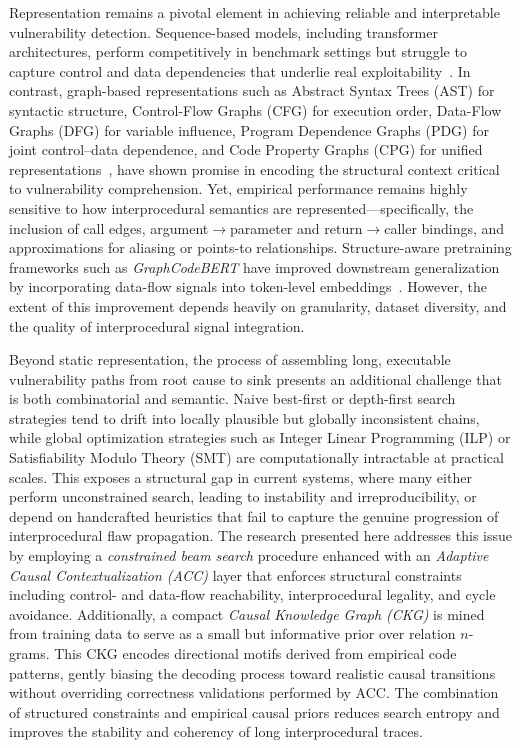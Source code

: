 \documentclass{buthesis}
\begin{document}
Representation remains a pivotal element in achieving reliable and interpretable vulnerability detection. Sequence-based models, including transformer architectures, perform competitively in benchmark settings but struggle to capture control and data dependencies that underlie real exploitability~\cite{fu2022linevul,Chakraborty2020}. In contrast, graph-based representations such as Abstract Syntax Trees (AST) for syntactic structure, Control-Flow Graphs (CFG) for execution order, Data-Flow Graphs (DFG) for variable influence, Program Dependence Graphs (PDG) for joint control–data dependence, and Code Property Graphs (CPG) for unified representations~\cite{Zhou2019}, have shown promise in encoding the structural context critical to vulnerability comprehension. Yet, empirical performance remains highly sensitive to how interprocedural semantics are represented—specifically, the inclusion of call edges, argument$\rightarrow$parameter and return$\rightarrow$caller bindings, and approximations for aliasing or points-to relationships. Structure-aware pretraining frameworks such as \emph{GraphCodeBERT} have improved downstream generalization by incorporating data-flow signals into token-level embeddings~\cite{guo2021graphcodebert,Li2022Empirical}. However, the extent of this improvement depends heavily on granularity, dataset diversity, and the quality of interprocedural signal integration.

Beyond static representation, the process of assembling long, executable vulnerability paths from root cause to sink presents an additional challenge that is both combinatorial and semantic. Naive best-first or depth-first search strategies tend to drift into locally plausible but globally inconsistent chains, while global optimization strategies such as Integer Linear Programming (ILP) or Satisfiability Modulo Theory (SMT) are computationally intractable at practical scales. This exposes a structural gap in current systems, where many either perform unconstrained search, leading to instability and irreproducibility, or depend on handcrafted heuristics that fail to capture the genuine progression of interprocedural flaw propagation. The research presented here addresses this issue by employing a \emph{constrained beam search} procedure enhanced with an \emph{Adaptive Causal Contextualization (ACC)} layer that enforces structural constraints including control- and data-flow reachability, interprocedural legality, and cycle avoidance. Additionally, a compact \emph{Causal Knowledge Graph (CKG)} is mined from training data to serve as a small but informative prior over relation $n$-grams. This CKG encodes directional motifs derived from empirical code patterns, gently biasing the decoding process toward realistic causal transitions without overriding correctness validations performed by ACC. The combination of structured constraints and empirical causal priors reduces search entropy and improves the stability and coherency of long interprocedural traces.
\end{document}
